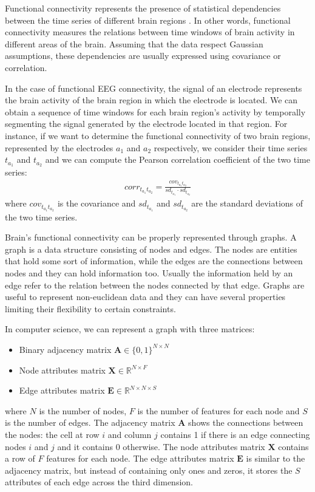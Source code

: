 Functional connectivity represents the presence of statistical dependencies between the time series of different brain regions \cite{NeurobiologyLanguage:functionalconnectivity}. In other words, functional connectivity measures the relations between time windows of brain activity in different areas of the brain. Assuming that the data respect Gaussian assumptions, these dependencies are usually expressed using covariance or correlation.

In the case of functional EEG connectivity, the signal of an electrode represents the brain activity of the brain region in which the electrode is located. We can obtain a sequence of time windows for each brain region's activity by temporally segmenting the signal generated by the electrode located in that region. For instance, if we want to determine the functional connectivity of two brain regions, represented by the electrodes $a_1$ and $a_2$ respectively, we consider their time series $t_{a_1}$ and $t_{a_2}$ and we can compute the Pearson correlation coefficient of the two time series:
\begin{align}
    \textit{corr}_{t_{a_1} t_{a_2}} = \frac{\textit{cov}_{t_{a_1} t_{a_2}}}{\textit{sd}_{t_{a_1}} \cdot \textit{sd}_{t_{a_2}}}
\end{align}
where $\textit{cov}_{t_{a_1} t_{a_2}}$ is the covariance and $\textit{sd}_{t_{a_1}}$ and $\textit{sd}_{t_{a_2}}$ are the standard deviations of the two time series.

Brain's functional connectivity can be properly represented through graphs. A graph is a data structure consisting of nodes and edges. The nodes are entities that hold some sort of information, while the edges are the connections between nodes and they can hold information too. Usually the information held by an edge refer to the relation between the nodes connected by that edge. Graphs are useful to represent non-euclidean data and they can have several properties limiting their flexibility to certain constraints.

In computer science, we can represent a graph with three matrices:
\begin{itemize}
    \item Binary adjacency matrix $\mathbf{A} \in\{0,1\}^{N \times N}$
    \item Node attributes matrix $\mathbf{X} \in \mathbb{R}^{N \times F}$
    \item Edge attributes matrix $\mathbf{E} \in \mathbb{R}^{N \times N \times S}$
\end{itemize}
where $N$ is the number of nodes, $F$ is the number of features for each node and $S$ is the number of edges. The adjacency matrix $\mathbf{A}$ shows the connections between the nodes: the cell at row $i$ and column $j$ contains 1 if there is an edge connecting nodes $i$ and $j$ and it contains 0 otherwise. The node attributes matrix $\mathbf{X}$ contains a row of $F$ features for each node. The edge attributes matrix $\mathbf{E}$ is similar to the adjacency matrix, but instead of containing only ones and zeros, it stores the $S$ attributes of each edge across the third dimension.

